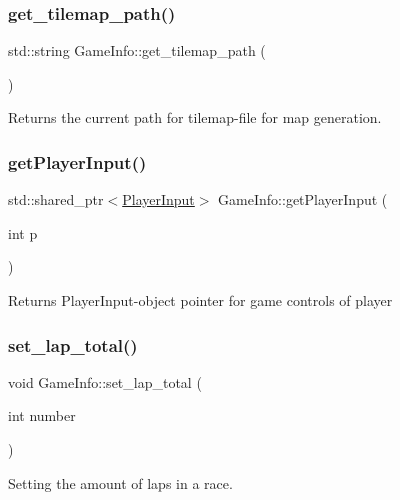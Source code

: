 \subsubsection{\texorpdfstring{get\+\_\+tilemap\+\_\+path()}{get\_tilemap\_path()}}
{\footnotesize\ttfamily std\+::string Game\+Info\+::get\+\_\+tilemap\+\_\+path (\begin{DoxyParamCaption}{ }\end{DoxyParamCaption})\hspace{0.3cm}{\ttfamily [inline]}}

Returns the current path for tilemap-\/file for map generation. \hypertarget{classGameInfo_a4c6bf794f57e952748633c7897d4741d}{}\label{classGameInfo_a4c6bf794f57e952748633c7897d4741d} 
\subsubsection{\texorpdfstring{get\+Player\+Input()}{getPlayerInput()}}
{\footnotesize\ttfamily std\+::shared\+\_\+ptr$<$\hyperlink{classPlayerInput}{Player\+Input}$>$ Game\+Info\+::get\+Player\+Input (\begin{DoxyParamCaption}\item[{int}]{p }\end{DoxyParamCaption})\hspace{0.3cm}{\ttfamily [inline]}}

Returns Player\+Input-\/object pointer for game controls of player \hypertarget{classGameInfo_a1c348163ac323c617b0306f946d17baa}{}\label{classGameInfo_a1c348163ac323c617b0306f946d17baa} 
\subsubsection{\texorpdfstring{set\+\_\+lap\+\_\+total()}{set\_lap\_total()}}
{\footnotesize\ttfamily void Game\+Info\+::set\+\_\+lap\+\_\+total (\begin{DoxyParamCaption}\item[{int}]{number }\end{DoxyParamCaption})\hspace{0.3cm}{\ttfamily [inline]}}

Setting the amount of laps in a race. \hypertarget{classGameInfo_a4269ef3313bbf20946f47bbd1c272b6d}{}\label{classGameInfo_a4269ef3313bbf20946f47bbd1c272b6d} 

